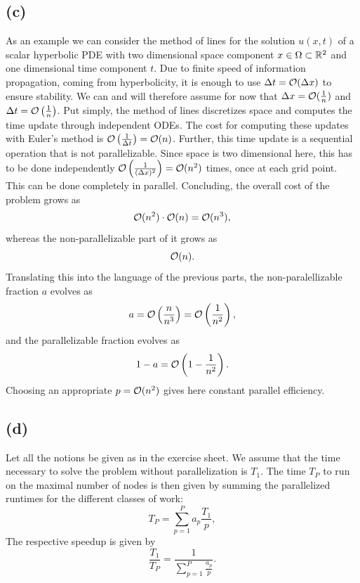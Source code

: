 \subsection*{(c)}
\FloatBarrier
As an example we can consider the method of lines for the solution $u(x, t)$ of a scalar hyperbolic PDE with two dimensional space component $x \in \Omega \subset \mathbb{R}^2$ and one dimensional time component $t$. Due to finite speed of information propagation, coming from hyperbolicity, it is enough to use $\Delta t = \mathcal{O}(\Delta x)$ to ensure stability. We can and will therefore assume for now that $\Delta x = \mathcal{O}(\frac{1}{n})$ and $\Delta t = \mathcal{O}\left(\frac{1}{n}\right)$. Put simply, the method of lines discretizes space and computes the time update through independent ODEs. The cost for computing these updates with Euler's method is $\mathcal{O}\left(\frac{1}{\Delta t}\right) = \mathcal{O}(n)$. Further, this time update is a sequential operation that is not parallelizable. Since space is two dimensional here, this has to be done independently $\mathcal{O}\left(\frac{1}{(\Delta x)^2}\right) = \mathcal{O}(n^2)$ times, once at each grid point. This can be done completely in parallel. Concluding, the overall cost of the problem grows as
\[
\mathcal{O}(n^2) \cdot \mathcal{O}(n) = \mathcal{O}(n^3),
\]
whereas the non-parallelizable part of it grows as
\[
\mathcal{O}(n).
\]
Translating this into the language of the previous parts, the non-paralellizable fraction $a$ evolves as
\[
a = \mathcal{O}\left(\frac{n}{n^3}\right) = \mathcal{O}\left(\frac{1}{n^2}\right),
\]
and the parallelizable fraction evolves as
\[
1 - a = \mathcal{O}\left(1 - \frac{1}{n^2}\right).
\]
Choosing an appropriate $p = \mathcal{O}(n^2)$ gives here constant parallel efficiency.
\FloatBarrier

\subsection*{(d)}
\FloatBarrier
Let all the notions be given as in the exercise sheet. We assume that the time necessary to solve the problem without parallelization is $T_1$. The time $T_P$ to run on the maximal number of nodes is then given by summing the parallelized runtimes for the different classes of work:
\[
T_P = \sum_{p = 1}^P a_p \frac{T_1}{p},
\]
The respective speedup is given by
\[
\frac{T_1}{T_P} = \frac{1}{\sum_{p = 1}^P \frac{a_p}{p}}.
\]
\FloatBarrier
  
  
  
  
  
  
  
  
  
  
  
  
  
  
  
  
  
  
  
  
  
  
  
  
  
  
  
  
  
  
  
  
  
  
  
  
  
  
  
  
  
  
  
  
  
  
  
  
  
  
  